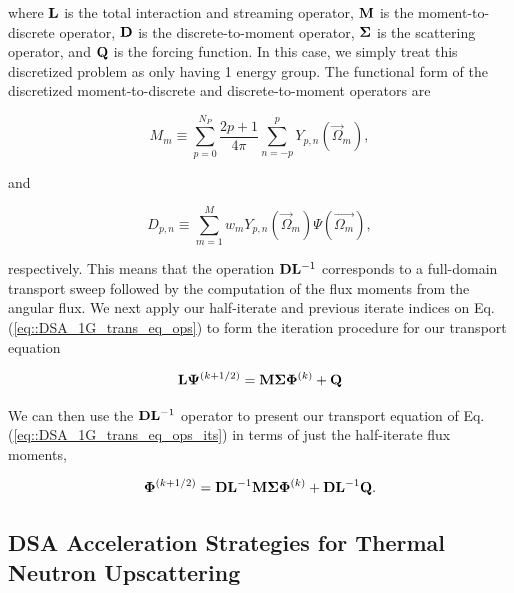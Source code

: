 \noindent where ${\bf L}$ is the total interaction and streaming operator, ${\bf M}$ is the moment-to-discrete operator, ${\bf D}$ is the discrete-to-moment operator, ${\bf \Sigma}$ is the scattering operator, and ${\bf Q}$ is the forcing function. In this case, we simply treat this discretized problem as only having 1 energy group. The functional form of the discretized moment-to-discrete and discrete-to-moment operators are

\begin{equation}
\label{eq::DSA_1G_M}
M_m \equiv \sum_{p=0}^{N_P} \frac{2p + 1}{4 \pi}   \sum_{n=-p}^{p}  Y_{p,n} (  \vec{\Omega}_m )   ,
\end{equation}

\noindent and 

\begin{equation}
\label{eq::DSA_1G_D}
D_{p,n} \equiv \sum_{m=1}^M w_m Y_{p,n} (\vec{\Omega}_m)  \Psi(\vec{\Omega_m}) ,
\end{equation}

\noindent respectively. This means that the operation ${\bf D} {\bf L}^{-1}$ corresponds to a full-domain transport sweep followed by the computation of the flux moments from the angular flux. We next apply our half-iterate and previous iterate indices on Eq. (\ref{eq::DSA_1G_trans_eq_ops}) to form the iteration procedure for our transport equation

\begin{equation}
\label{eq::DSA_1G_trans_eq_ops_its}
{\bf L} {\bf \Psi}^{(k+1/2)}= {\bf M} {\bf \Sigma} {\bf \Phi}^{(k)}  +    {\bf Q} 
\end{equation}

\noindent We can then use the ${\bf D} {\bf L}^{-1}$ operator to present our transport equation of Eq. (\ref{eq::DSA_1G_trans_eq_ops_its}) in terms of just the half-iterate flux moments,

\begin{equation}
\label{eq::DSA_1G_trans_eq_ops_mom}
 {\bf \Phi}^{(k+1/2)}  =  {\bf D} {\bf L}^{-1} {\bf M} {\bf \Sigma}  {\bf \Phi}^{(k)} +  {\bf D} {\bf L}^{-1}   {\bf Q} .
\end{equation}

\subsection{DSA Acceleration Strategies for Thermal Neutron Upscattering}
\label{sec::DSA_DSA_MG}



